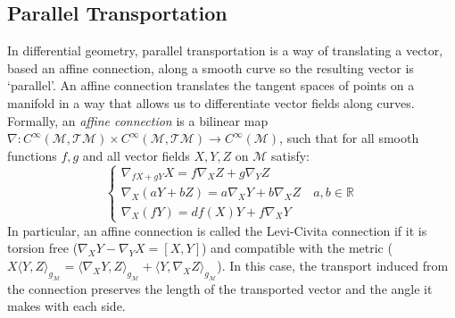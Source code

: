 \documentclass[10pt,twocolumn,letterpaper]{article}
\def\M{\mathcal{M}}
\def\T{\mathcal{T}}
\def\RR{\mathbb{R}}
\begin{document}
\subsection{Parallel Transportation}
\label{subsec:PT}
In differential geometry, parallel transportation is a way of translating a vector, based an affine connection, along a smooth curve so the resulting vector is `parallel'. An affine connection translates the tangent spaces of points on a manifold in a way that allows us to differentiate vector fields along curves. Formally, an {\it affine connection} is a bilinear map $\nabla: C^{\infty}(\M, \T \M) \times C^{\infty}(\M, \T \M) \rightarrow C^{\infty}(\M)$, such that for all smooth functions $f, g$ and all vector fields $X,Y, Z$ on $\M$ satisfy:
\begin{equation}
\left\{\begin{array}{c}
\nabla_{fX + gY} X = f \nabla_X Z + g \nabla_Y Z \qquad \quad \\
\nabla_{X} (aY + bZ) = a \nabla_X Y + b \nabla_X Z  \quad a, b \in \RR \\
\nabla_X (fY) = df(X)Y+f\nabla_X Y  \qquad
\end{array}
\right.
\end{equation}
In particular, an affine connection is called the Levi-Civita connection if it is torsion free ($\nabla_X Y - \nabla_Y X = [X,Y]$) and compatible with the metric ( $X\langle Y,Z\rangle_{g_\M} = \langle\nabla_X Y,Z\rangle_{g_\M} + \langle Y,\nabla_X Z\rangle_{g_\M}$).
In this case, the transport induced from the connection preserves the length of the transported vector and the angle it makes with each side.
\end{document}
